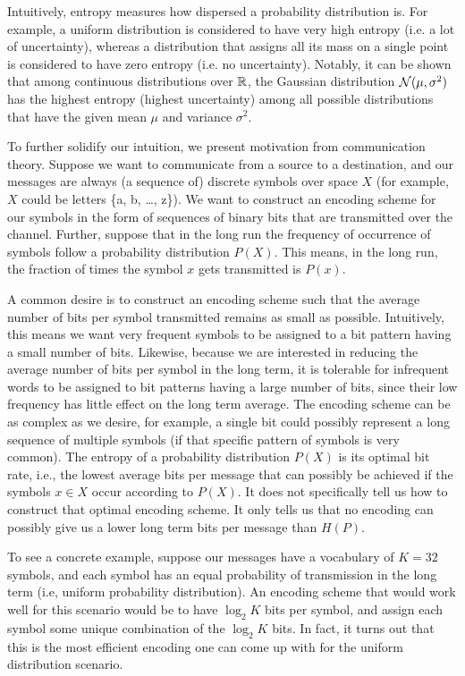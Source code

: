 \documentclass[a4paper]{article}
\begin{document}
Intuitively, entropy measures how dispersed a probability 
distribution is. For example, a uniform distribution is 
considered to have very high entropy (i.e. a lot of uncertainty), 
whereas a distribution that assigns all its mass on a single 
point is considered to have zero entropy (i.e. no uncertainty). 
Notably, it can be shown that among continuous distributions 
over $\mathbb{R}$, the Gaussian distribution $\mathcal{N}(\mu, \sigma^2)$ has 
the highest entropy (highest uncertainty) among all possible 
distributions that have the given mean $\mu$ and variance $\sigma^2$.

To further solidify our intuition, we present motivation from 
communication theory. Suppose we want to communicate from a 
source to a destination, and our messages are always 
(a sequence of) discrete symbols over space $X$ 
(for example, $X$ could be letters \{a, b, \dots, z\}). 
We want to construct an encoding scheme for our symbols 
in the form of sequences of binary bits that are transmitted 
over the channel. Further, suppose that in the long run the 
frequency of occurrence of symbols follow a probability 
distribution $P(X)$. This means, in the long run, the fraction 
of times the symbol $x$ gets transmitted is $P(x)$.

A common desire is to construct an encoding scheme such that 
the average number of bits per symbol transmitted remains as 
small as possible. Intuitively, this means we want very 
frequent symbols to be assigned to a bit pattern having a 
small number of bits. Likewise, because we are interested in 
reducing the average number of bits per symbol in the long 
term, it is tolerable for infrequent words to be assigned to 
bit patterns having a large number of bits, since their low 
frequency has little effect on the long term average. The 
encoding scheme can be as complex as we desire, for example, 
a single bit could possibly represent a long sequence of 
multiple symbols (if that specific pattern of symbols is very 
common). The entropy of a probability distribution $P(X)$ is 
its optimal bit rate, i.e., the lowest average bits per 
message that can possibly be achieved if the symbols $x \in X$ 
occur according to $P(X)$. It does not specifically tell us 
how to construct that optimal encoding scheme. It only tells 
us that no encoding can possibly give us a lower long term 
bits per message than $H(P)$.

To see a concrete example, suppose our messages have a 
vocabulary of $K = 32$ symbols, and each symbol has an equal 
probability of transmission in the long term (i.e, uniform 
probability distribution). An encoding scheme that would 
work well for this scenario would be to have $\log_2 K$ bits 
per symbol, and assign each symbol some unique combination 
of the $\log_2 K$ bits. In fact, it turns out that this is the 
most efficient encoding one can come up with for the uniform 
distribution scenario.
\end{document}
